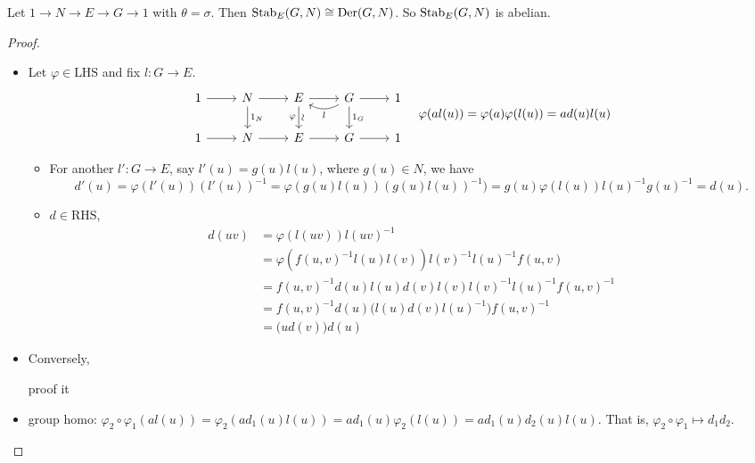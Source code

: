 \begin{theorem}
  Let $1\to N\to E\to G\to 1$ with $\theta = \sigma$. Then
  $\operatorname{Stab}_E(G, N) \cong \operatorname{Der}(G, N)$. So $\operatorname{Stab}_E(G, N)$ is abelian.
  \begin{proof} \mbox{}
    \begin{itemize}
      \item Let $\varphi \in \text{LHS}$ and fix $l:G\to E$.
        \[
          \begin{tikzcd}
            1 \arrow[r]
            & N \arrow[d, "1_N"] \arrow[r]
            & E \arrow[d, "\rotatebox{90}{\(\sim\)}", "\varphi"'] \arrow[r]
            & G \arrow[d, "1_G"] \arrow[r] \arrow[l, bend left, "l"]
            & 1 \\
            1 \arrow[r] & N \arrow[r] & E \arrow[r] & G \arrow[r] & 1
          \end{tikzcd}
          \quad \varphi(al(u)) = \varphi(a)\varphi(l(u)) = a d(u) l(u)
        \]
        \begin{itemize}
          \item For another $l':G\to E$, say $l'(u) = g(u)l(u)$, where
            $g(u) \in N$,
            we have
            \[ d'(u) = \varphi(l'(u))(l'(u))^{-1}
            = \varphi(g(u)l(u))(g(u)l(u))^{-1})
            = g(u)\varphi(l(u)) l(u)^{-1} g(u)^{-1} = d(u).
            \]

          \item $d \in \text{RHS}$, 
            \begin{align*}
              d(uv) &= \varphi(l(uv))l(uv)^{-1} \\
                    &= \varphi(f(u, v)^{-1} l(u)l(v)) l(v)^{-1} l(u)^{-1} f(u, v) \\
                    &= f(u, v)^{-1} d(u)l(u) d(v)l(v) l(v)^{-1} l(u)^{-1} f(u, v)^{-1} \\
                    &= f(u, v)^{-1} d(u) \big(l(u) d(v) l(u)^{-1}\big) f(u, v)^{-1} \\
                    &= \big(u d(v)\big) d(u)
            \end{align*}
        \end{itemize}

      \item Conversely, \begin{exercise} proof it \end{exercise}
      \item group homo:
        $\varphi_2\circ\varphi_1(al(u)) = \varphi_2(ad_1(u)l(u))
        = ad_1(u)\varphi_2(l(u)) = a d_1(u) d_2(u) l(u)$.
        That is, $\varphi_2 \circ \varphi_1 \mapsto d_1 d_2$.
        \qedhere
    \end{itemize}
  \end{proof}
\end{theorem}

